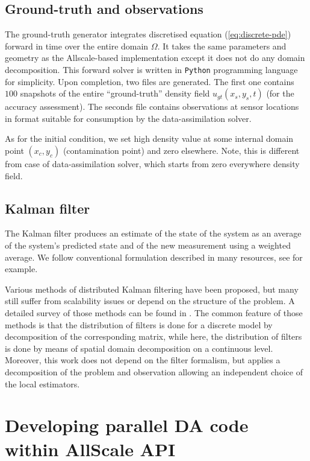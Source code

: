 \documentclass[conference,compsoc]{IEEEtran}
\begin{document}
\subsection{Ground-truth and observations}
\label{subsec:obsgen}
The ground-truth generator integrates discretised equation (\ref{eq:discrete-pde}) forward in time over the entire domain $\Omega$. It takes the same parameters and geometry as the Allscale-based implementation except it does not do any domain decomposition. This forward solver is written in \texttt{Python} programming language for simplicity. Upon completion, two files are generated. The first one contains $100$ snapshots of the entire ``ground-truth'' density field $u_{gt}(x_s,y_s,t)$ (for the accuracy assessment). The seconds file contains observations at sensor locations in format suitable for consumption by the data-assimilation solver. 

As for the initial condition, we set high density value at some internal domain point $(x_c,y_c)$ (contamination point) and zero elsewhere. Note, this is different from case of data-assimilation solver, which starts from zero everywhere density field.

\subsection{Kalman filter}

The Kalman filter produces an estimate of the state of the system as an average of the system's predicted state and of the new measurement using a weighted average. We follow conventional formulation described in many resources, see \cite{Welch06} for example.

Various methods of distributed Kalman filtering have been proposed, but many still suffer from scalability issues or depend on the structure of the problem. A detailed survey of those methods can be found in \cite{mahmoud2013distributed}. The common feature of those methods is that the distribution of filters is done for a discrete model by decomposition of the corresponding matrix, while here, the distribution of filters is done by means of spatial domain decomposition on
a continuous level. Moreover, this work does not depend on the filter formalism,
but applies a decomposition of the problem and observation allowing an independent choice of the local estimators.

\section{Developing parallel DA code within AllScale API}
\label{sec:porting}
\end{document}
